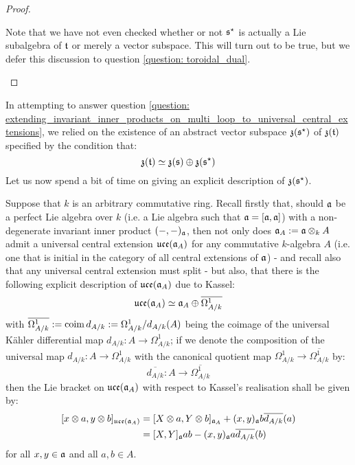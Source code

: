 \begin{proof}
\begin{enumerate}
                        Note that we have not even checked whether or not $\mathfrak{s}^{\star}$ is actually a Lie subalgebra of $\mathfrak{t}$ or merely a vector subspace. This will turn out to be true, but we defer this discussion to question \ref{question: toroidal_dual}. 
                    \end{enumerate}
                \end{proof}
            \begin{remark} \label{remark: centres_of_dual_toroidal_lie_bialgebras}
                In attempting to answer question \ref{question: extending_invariant_inner_products_on_multi_loop_to_universal_central_extensions}, we relied on the existence of an abstract vector subspace $\mathfrak{z}(\mathfrak{s}^{\star})$ of $\mathfrak{z}(\mathfrak{t})$ specified by the condition that:
                    $$\mathfrak{z}(\mathfrak{t}) \simeq \mathfrak{z}(\mathfrak{s}) \oplus \mathfrak{z}(\mathfrak{s}^{\star})$$
                Let us now spend a bit of time on giving an explicit description of $\mathfrak{z}(\mathfrak{s}^{\star})$. 

                Suppose that $k$ is an arbitrary commutative ring. Recall firstly that, should $\mathfrak{a}$ be a perfect Lie algebra over $k$ (i.e. a Lie algebra such that $\mathfrak{a} = [\mathfrak{a}, \mathfrak{a}]$) with a non-degenerate invariant inner product $(-, -)_{\mathfrak{a}}$, then not only does $\a_A := \a \tensor_k A$ admit a universal central extension $\mathfrak{uce}(\mathfrak{a}_A)$ for any commutative $k$-algebra $A$ (i.e. one that is initial in the category of all central extensions of $\mathfrak{a}$) - and recall also that any universal central extension must split - but also, that there is the following explicit description of $\mathfrak{uce}(\mathfrak{a}_A)$ due to Kassel:
                    $$\mathfrak{uce}(\mathfrak{a}_A) \simeq \mathfrak{a}_A \oplus \overline{\Omega^1_{A/k}}$$
                with $\overline{\Omega^1_{A/k}} := \operatorname{coim} d_{A/k} := \Omega^1_{A/k}/d_{A/k}(A)$ being the coimage of the universal K\"ahler differential map $d_{A/k}: A \to \Omega^1_{A/k}$; if we denote the composition of the universal map $d_{A/k}: A \to \Omega^1_{A/k}$ with the canonical quotient map $\Omega^1_{A/k} \to \overline{\Omega^1_{A/k}}$ by:
                    $$\overline{d_{A/k}}: A \to \overline{\Omega^1_{A/k}}$$
                then the Lie bracket on $\mathfrak{uce}(\mathfrak{a}_A)$ with respect to Kassel's realisation shall be given by:
                    $$
                        \begin{aligned}
                            [ x \tensor a, y \tensor b ]_{\uce(\a_A)} & = [ X \tensor a, Y \tensor b ]_{\a_A} + (x, y)_{\a} b \overline{d_{A/k}}(a)
                            \\
                            & = [X, Y]_{\a} ab - (x, y)_{\a} a \overline{d_{A/k}}(b)
                        \end{aligned}
                    $$
                for all $x, y \in \mathfrak{a}$ and all $a, b \in A$.
                    

\end{remark}
